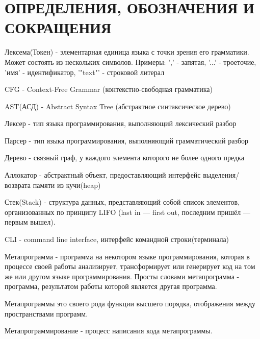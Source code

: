 
\chapter*{ОПРЕДЕЛЕНИЯ, ОБОЗНАЧЕНИЯ И СОКРАЩЕНИЯ}             %

\newcommand{\acrstyle}[1]{#1}


\acrstyle{Лексема(Токен)} - элементарная единица языка с точки зрения его грамматики. Может состоять из нескольких символов.
Примеры: ',' - запятая, '...' - троеточие, 'имя' - идентификатор, '"text"' - строковой литерал

\acrstyle{CFG} - Context-Free Grammar (контекстно-свободная грамматика)

\acrstyle{AST(АСД)} - Abstract Syntax Tree (абстрактное синтаксическое дерево)

\acrstyle{Лексер} - тип языка программирования, выполняющий лексический разбор

\acrstyle{Парсер} - тип языка программирования, выполняющий грамматический разбор


\acrstyle{Дерево} - связный граф, у каждого элемента которого не более одного предка

\acrstyle{Аллокатор} - абстрактный объект, предоставляющий интерфейс выделения/возврата памяти из кучи(heap)

\acrstyle{Стек(Stack)} -  структура данных, представляющий собой список элементов, организованных по принципу LIFO (last in — first out, последним пришёл — первым вышел).

\acrstyle{CLI} -  command line interface, интерфейс командной строки(терминала)


Метапрограмма - программа на некотором языке программирования, которая в процессе своей работы анализирует, трансформирует или генерирует код на том же или другом языке программирования.
Просты словами метапрограмма - программа, результатом работы которой является другая программа.

Метапрограммы это своего рода функции высшего порядка\cite{wiki-hof}, отображения между пространствами программ.

Метапрограммирование - процесс написания кода метапрограммы.